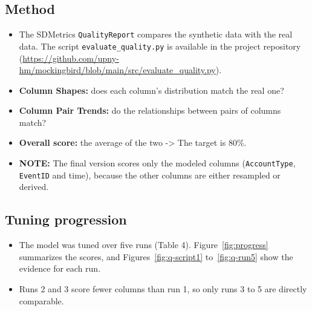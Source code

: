 \documentclass[11pt,a4paper]{article}
\begin{document}
\subsection{Method}
\begin{itemize}
  \item The SDMetrics \texttt{QualityReport} compares the synthetic data with the real data. The script \texttt{evaluate\_quality.py} is available in the project repository (\textcolor{blue}{\url{https://github.com/upny-hm/mockingbird/blob/main/src/evaluate_quality.py}}).
  \item \textbf{Column Shapes:} does each column's distribution match the real one?
  \item \textbf{Column Pair Trends:} do the relationships between pairs of columns match?
  \item \textbf{Overall score:} the average of the two -> The target is 80\%.
  \item \textbf{NOTE:} The final version scores only the modeled columns (\texttt{AccountType}, \texttt{EventID} and time), because the other columns are either resampled or derived.
\end{itemize}

\subsection{Tuning progression}
\begin{itemize}
  \item The model was tuned over five runs (Table 4). Figure~\ref{fig:progress} summarizes the scores, and Figures~\ref{fig:q-script1} to~\ref{fig:q-run5} show the evidence for each run.
  \item Runs 2 and 3 score fewer columns than run 1, so only runs 3 to 5 are directly comparable.
\end{itemize}
\end{document}
